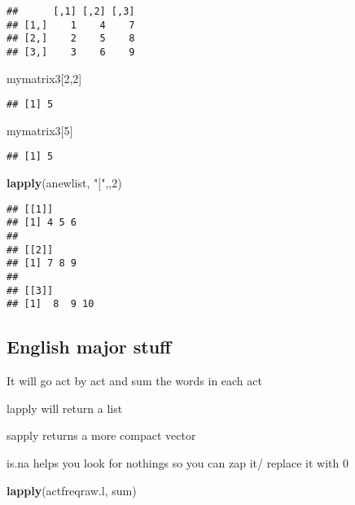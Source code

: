 \documentclass[
]{article}
\newenvironment{Shaded}{\begin{snugshade}}{\end{snugshade}}
\newcommand{\DecValTok}[1]{\textcolor[rgb]{0.00,0.00,0.81}{#1}}
\newcommand{\KeywordTok}[1]{\textcolor[rgb]{0.13,0.29,0.53}{\textbf{#1}}}
\newcommand{\NormalTok}[1]{#1}
\newcommand{\StringTok}[1]{\textcolor[rgb]{0.31,0.60,0.02}{#1}}
\begin{document}
\begin{verbatim}
##      [,1] [,2] [,3]
## [1,]    1    4    7
## [2,]    2    5    8
## [3,]    3    6    9
\end{verbatim}

\begin{Shaded}
\begin{Highlighting}[]
\NormalTok{mymatrix3[}\DecValTok{2}\NormalTok{,}\DecValTok{2}\NormalTok{]}
\end{Highlighting}
\end{Shaded}

\begin{verbatim}
## [1] 5
\end{verbatim}

\begin{Shaded}
\begin{Highlighting}[]
\NormalTok{mymatrix3[}\DecValTok{5}\NormalTok{]}
\end{Highlighting}
\end{Shaded}

\begin{verbatim}
## [1] 5
\end{verbatim}

\begin{Shaded}
\begin{Highlighting}[]
\KeywordTok{lapply}\NormalTok{(anewlist, }\StringTok{"["}\NormalTok{,,}\DecValTok{2}\NormalTok{)}
\end{Highlighting}
\end{Shaded}

\begin{verbatim}
## [[1]]
## [1] 4 5 6
## 
## [[2]]
## [1] 7 8 9
## 
## [[3]]
## [1]  8  9 10
\end{verbatim}

\hypertarget{english-major-stuff}{%
\subsection{English major stuff}\label{english-major-stuff}}

It will go act by act and sum the words in each act

lapply will return a list

sapply returns a more compact vector

is.na helps you look for nothings so you can zap it/ replace it with 0

\begin{Shaded}
\begin{Highlighting}[]
\KeywordTok{lapply}\NormalTok{(actfreqraw.l, sum)}
\end{Highlighting}
\end{Shaded}
\end{document}
